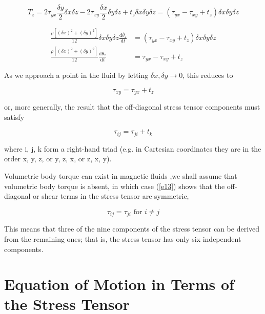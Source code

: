 \documentclass{article}
\begin{document}
{$$T_{z} = 2\tau_{yx}\frac{\delta y}{2}\delta x\delta z - 2\tau_{xy}\frac{\delta x}{2}\delta y\delta z + t_{z}\delta x\delta y\delta z = (\tau_{yx}-\tau_{xy}+t_{z})\delta x\delta y\delta z$$

\begin{equation}
\begin{split}
\frac{\rho[(\delta x)^2 + (\delta y)^2]}{12}\delta x\delta y \delta z\frac{\text{d}\dot{\theta_{z}}}{\text{d}t} &= (\tau_{yx}-\tau_{xy}+t_{z})\delta x\delta y\delta z\\
\frac{\rho[(\delta x)^2 + (\delta y)^2]}{12}\frac{\text{d}\dot{\theta_{z}}}{\text{d}t} &= \tau_{yx}-\tau_{xy}+t_{z} \label{e12}
\end{split}
\end{equation}

As we approach a point in the fluid by letting $\delta x, \delta y \to 0$, this reduces to

$$\tau_{xy} = \tau_{yx} + t_{z}$$

or, more generally, the result that the off-diagonal stress tensor components must satisfy

\begin{equation}
\tau_{ij} = \tau_{ji} + t_{k} \label{e13}
\end{equation}

where i, j, k form a right-hand triad (e.g. in Cartesian coordinates they are in the order x,
y, z, or y, z, x, or z, x, y).

Volumetric body torque can exist in magnetic fluids ,we shall assume that volumetric body torque is absent, in which case (\ref{e13}) shows that the off-diagonal or shear terms in the stress tensor are symmetric,

\begin{equation}
\tau_{ij} = \tau_{ji} \text{ for } i \neq j \label{e14}
\end{equation}

This means that three of the nine components of the stress tensor can be derived from the remaining ones; that is, the stress tensor has only six independent components.

\section*{Equation of Motion in Terms of the Stress Tensor}

}
\end{document}
